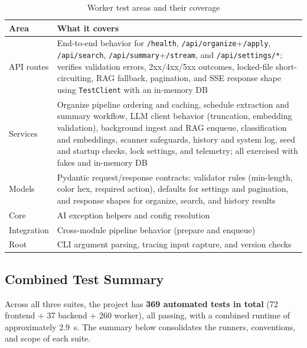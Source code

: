 \documentclass[12pt,oneside,openright,a4paper]{cpe-english-project}
\begin{document}
\begin{table}[H]
\centering
\caption{Worker test areas and their coverage}
\begin{tabular}{|p{}|p{}|}
\hline
\textbf{Area} & \textbf{What it covers} \\
\hline
API routes & End-to-end behavior for \texttt{/health}, \texttt{/api/organize}+\texttt{/apply}, \texttt{/api/search}, \texttt{/api/summary}+\texttt{/stream}, and \texttt{/api/settings/*}; verifies validation errors, 2xx/4xx/5xx outcomes, locked-file short-circuiting, RAG fallback, pagination, and SSE response shape using \texttt{TestClient} with an in-memory DB \\
\hline
Services & Organize pipeline ordering and caching, schedule extraction and summary workflow, LLM client behavior (truncation, embedding validation), background ingest and RAG enqueue, classification and embeddings, scanner safeguards, history and system log, seed and startup checks, lock settings, and telemetry; all exercised with fakes and in-memory DB \\
\hline
Models & Pydantic request/response contracts: validator rules (min-length, color hex, required action), defaults for settings and pagination, and response shapes for organize, search, and history results \\
\hline
Core & AI exception helpers and config resolution \\
\hline
Integration & Cross-module pipeline behavior (prepare and enqueue) \\
\hline
Root & CLI argument parsing, tracing input capture, and version checks \\
\hline
\end{tabular}
\end{table}

\subsection{Combined Test Summary}
Across all three suites, the project has \textbf{369 automated tests in total} (72 frontend + 37 backend + 260 worker), all passing, with a combined runtime of approximately 2.9~s. The summary below consolidates the runners, conventions, and scope of each suite.
\end{document}
